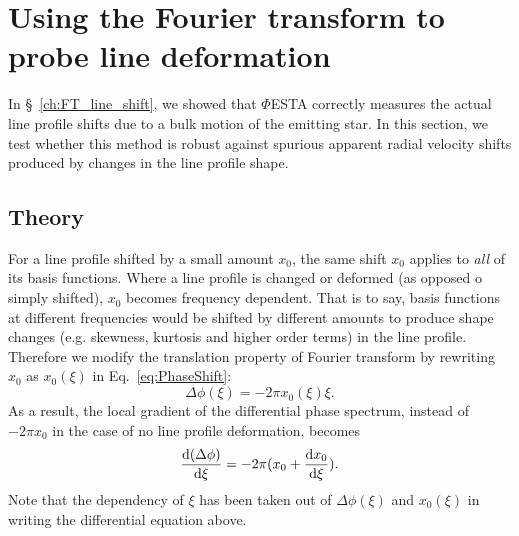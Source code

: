 \pagebreak

\section{Using the Fourier transform to probe line deformation}
\label{\thesection}
\label{sec:FT_ld}

In \S~\ref{ch:FT_line_shift}, we showed that $\mathit{\Phi}$ESTA correctly measures the actual line profile shifts due to a bulk motion of the emitting star. In this section, we test whether this method is robust against spurious apparent radial velocity shifts produced by changes in the line profile shape.


\subsection{Theory}
\label{sec:LD_Theory}

For a line profile shifted by a small amount $x_0$, the same shift $x_0$ applies to \textit{all} of its basis functions. Where a line profile is changed or deformed (as opposed o simply shifted), $x_0$ becomes frequency dependent. That is to say, basis functions at different frequencies would be shifted by different amounts to produce shape changes (e.g. skewness, kurtosis and higher order terms) in the line profile. Therefore we modify the translation property of Fourier transform by rewriting $x_0$ as $x_0(\xi)$ in Eq.~\ref{eq:PhaseShift}:
\begin{equation}
	\Delta \phi(\xi) = -2 \pi x_0(\xi) \xi.
\label{eq:PhaseShift2_LPD}
\end{equation}
As a result, the local gradient of the differential phase spectrum, instead of $-2 \pi x_0$ in the case of no line profile deformation, becomes 
\begin{equation}
	\dv{(\Delta \phi)}{\xi} = -2 \pi (x_0 + \dv{x_0}{\xi}).
\label{eq:PhaseShift3_LPD}
\end{equation}
Note that the dependency of $\xi$ has been taken out of $\Delta \phi(\xi)$ and 
$x_0(\xi)$ in writing the differential equation above. 

